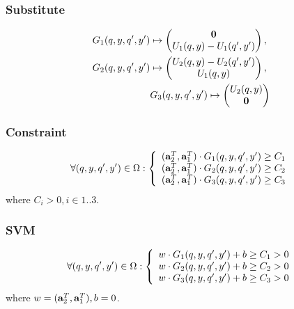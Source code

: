 \begin{frame}
\frametitle{Substitute}
\begin{equation}
	\begin{split}
		G_{1}(q, y, q', y') \mapsto 
			\begin{pmatrix}
			\vectzero \\
			U_{1}(q, y) - U_{1}(q', y')
			\end{pmatrix},\ 
\\
		G_{2}(q, y, q', y') \mapsto 
			\begin{pmatrix}
			U_{2}(q, y) - U_{2}(q', y')\\
			U_{1}(q, y)
			\end{pmatrix},\ 
\\
		G_{3}(q, y, q', y') \mapsto
			\begin{pmatrix}
			U_{2}(q, y)\\
			\vectzero \\
			\end{pmatrix}
	\end{split} \notag
\end{equation}
\end{frame}
\begin{frame}
\frametitle{Constraint}
\begin{equation}
\forall (q, y, q', y') \in \Omega :
\left\{
	\begin{array}{ll}
		(\mathbf{a}^{T}_{2}, \mathbf{a}^{T}_{1}) \cdot G_{1}(q, y, q', y') \geq C_{1} \\
		(\mathbf{a}^{T}_{2}, \mathbf{a}^{T}_{1}) \cdot G_{2}(q, y, q', y') \geq C_{2} \\
		(\mathbf{a}^{T}_{2}, \mathbf{a}^{T}_{1}) \cdot G_{3}(q, y, q', y')  \geq C_{3}
	\end{array}
\right.\notag
\end{equation}
where $C_i>0, i\in 1..3$.
\end{frame}

\begin{frame}
\frametitle{SVM}
\begin{equation}
\forall (q, y, q', y') \in \Omega :
\left\{
	\begin{array}{ll}
		w \cdot G_{1}(q, y, q', y') +b \geq C_1 > 0 \\
		w \cdot G_{2}(q, y, q', y') +b \geq C_2 > 0 \\
		w \cdot G_{3}(q, y, q', y') +b \geq C_3 > 0
	\end{array}
\right.\notag
\end{equation}
where $w = (\mathbf{a}^{T}_{2}, \mathbf{a}^{T}_{1}), b = 0$.
\end{frame}

